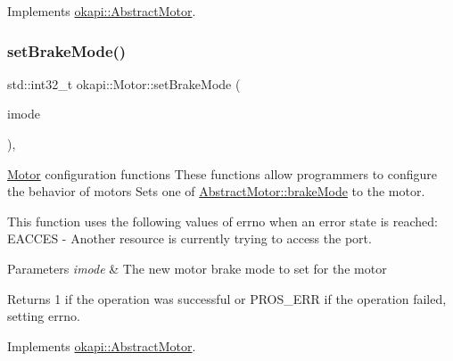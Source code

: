 Implements \mbox{\hyperlink{classokapi_1_1AbstractMotor_a15d12555f527109b046c65fe753d7e20}{okapi\+::\+Abstract\+Motor}}.

\mbox{\label{classokapi_1_1Motor_a2c40313fa5ff49c25947645885898f91}} 
\subsubsection{\texorpdfstring{setBrakeMode()}{setBrakeMode()}}
{\footnotesize\ttfamily std\+::int32\+\_\+t okapi\+::\+Motor\+::set\+Brake\+Mode (\begin{DoxyParamCaption}\item[{\mbox{\hyperlink{classokapi_1_1AbstractMotor_a132e0485dbb59a60c3f934338d8fa601}{Abstract\+Motor\+::brake\+Mode}}}]{imode }\end{DoxyParamCaption})\hspace{0.3cm}{\ttfamily [override]}, {\ttfamily [virtual]}}

\mbox{\hyperlink{classokapi_1_1Motor}{Motor}} configuration functions These functions allow programmers to configure the behavior of motors Sets one of \mbox{\hyperlink{classokapi_1_1AbstractMotor_a132e0485dbb59a60c3f934338d8fa601}{Abstract\+Motor\+::brake\+Mode}} to the motor.

This function uses the following values of errno when an error state is reached\+: E\+A\+C\+C\+ES -\/ Another resource is currently trying to access the port.


\begin{DoxyParams}{Parameters}
{\em imode} & The new motor brake mode to set for the motor \\
\hline
\end{DoxyParams}
\begin{DoxyReturn}{Returns}
1 if the operation was successful or P\+R\+O\+S\+\_\+\+E\+RR if the operation failed, setting errno. 
\end{DoxyReturn}


Implements \mbox{\hyperlink{classokapi_1_1AbstractMotor_af7bb7d0d895c89d6b193f500587a818b}{okapi\+::\+Abstract\+Motor}}.

\mbox{\label{classokapi_1_1Motor_ab54e856d8d55c1f53e1be113a9e90a00}} 
